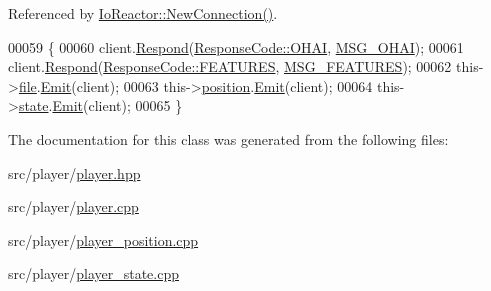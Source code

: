 Referenced by \hyperlink{io__reactor_8cpp_source_l00114}{Io\+Reactor\+::\+New\+Connection()}.


\begin{DoxyCode}
00059 \{
00060     client.\hyperlink{classResponseSink_ac2add6144c2804a6f0db34ad30046ed7}{Respond}(\hyperlink{io__response_8hpp_af5828b68a5f305a17b90321710d9b546a578a88371503e8fd23725bd3a684ed9e}{ResponseCode::OHAI}, \hyperlink{messages_8h_a58fd26477b5defa3dbdde5efbe862c21}{MSG\_OHAI});
00061     client.\hyperlink{classResponseSink_ac2add6144c2804a6f0db34ad30046ed7}{Respond}(\hyperlink{io__response_8hpp_af5828b68a5f305a17b90321710d9b546ab1fa6b4767532c2e890022101221bd08}{ResponseCode::FEATURES}, 
      \hyperlink{messages_8h_a29759ce3d7805e029d83ab11195e6bf9}{MSG\_FEATURES});
00062     this->\hyperlink{classPlayer_abcb788a7830c40ae5ba2a219c5341a58}{file}.\hyperlink{classPlayerFile_a00f044c74d07d778532953a917c24197}{Emit}(client);
00063     this->\hyperlink{classPlayer_a7b0a4ce9f2ebf3d1e026cf3e0ee61152}{position}.\hyperlink{classPlayerPosition_a66963c28fd9dffe0fd7338023310fa92}{Emit}(client);
00064     this->\hyperlink{classPlayer_afb60fdad921bce05783ef2709e849c27}{state}.\hyperlink{classPlayerState_aa93a9879688bfbd3d89ac102c079cbfd}{Emit}(client);
00065 \}
\end{DoxyCode}


The documentation for this class was generated from the following files\+:\begin{DoxyCompactItemize}
\item 
src/player/\hyperlink{player_8hpp}{player.\+hpp}\item 
src/player/\hyperlink{player_8cpp}{player.\+cpp}\item 
src/player/\hyperlink{player__position_8cpp}{player\+\_\+position.\+cpp}\item 
src/player/\hyperlink{player__state_8cpp}{player\+\_\+state.\+cpp}\end{DoxyCompactItemize}
